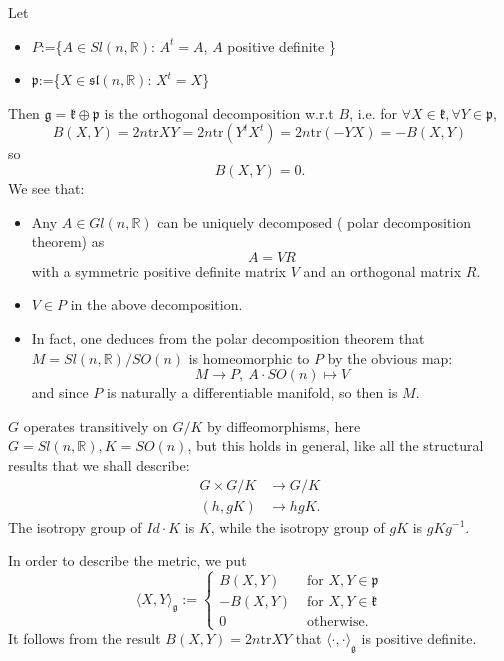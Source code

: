 	Let
	\begin{itemize}
		\item $P$:=\{$A \in S l(n, \mathbb{R})$: $A^{t}=A$, $A$
		{ positive definite }\}
		\item $\mathfrak p$:=\{$X\in
		\mathfrak{sl}(n,\mathbb{R})$: $X^t=X$\}
	\end{itemize}
	Then  $\mathfrak{g}=\mathfrak{k} \oplus \mathfrak{p}$ is the
	orthogonal decomposition w.r.t $B$, i.e. 
	for $\forall X\in \mathfrak k, \forall Y\in \mathfrak p$, 
	\[
	B(X,Y)=2n\text{tr}
	XY=2n\text{tr}(Y^tX^t)=2n\text{tr}(-YX)=-B(X,Y)
	\]
	so
	\[B(X,Y)=0.\]
	We see that:
	\begin{itemize}
		\item 	Any $A \in Gl(n, \mathbb{R})$ can be uniquely
		decomposed ( polar decomposition theorem) as
		\[
		A=V R
		\]
		with a symmetric positive definite matrix $V$ and an
		orthogonal matrix $R$.
	 
		\item $V \in P$ in the above decomposition.
		
		\item In fact, one deduces from the polar decomposition
		theorem that $M=S l(n, \mathbb{R}) / S O(n)$ is
		homeomorphic to $P$ by the obvious map:
		\[
		M\to P,\ A\cdot S O(n)\mapsto V
		\]
		and since $P$ is naturally a differentiable manifold, so
		then is $M$.
	\end{itemize}
	
	

	$G$ operates transitively on $G / K$ by diffeomorphisms, here
	$G=S l(n, \mathbb{R}), K=S O(n)$, but this holds in general,
	like all the structural results that we shall describe:
	\[
	\begin{aligned}
		G \times G / K & \rightarrow G / K \\
		(h, g K) & \rightarrow h g K .
	\end{aligned}
	\]
	The isotropy group of $Id \cdot K$ is $K$, while the isotropy group of $g K$ is $g K g^{-1}$.
	
	
	In order to describe the metric, we put
	\[
	\langle X, Y\rangle_{\mathfrak{g}}:=\left\{\begin{array}{cl}
		B(X, Y) & \text { for } X, Y \in \mathfrak{p} \\
		-B(X, Y) & \text { for } X, Y \in \mathfrak{k} \\
		0 & \text { otherwise. }
	\end{array}\right.
	\]
	It follows from the result $B(X,Y)=2n\text{tr} XY$ that
	$\langle\cdot, \cdot\rangle_{\mathfrak g}$ is positive
	definite. 

